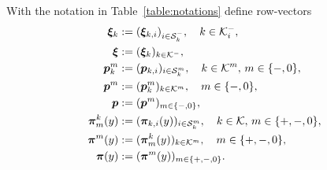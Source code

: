 %
 
With the notation in Table~\ref{table:notations} define row-vectors 
 \begin{align*}
	{\boldsymbol{\xi}}_k &:= ( \boldsymbol\xi_{k,i})_{i\in\mathcal{S}_k^-}, \quad  {k\in\mathcal K_i^-},
	\\ {\boldsymbol{\xi}}& := ( \boldsymbol \xi_k)_{k\in\mathcal K^-},
	\\\boldsymbol{p}^{m}_k &:= (  \boldsymbol p_{k,i})_{i\in\mathcal{S}_k^m}, \quad  k\in{\mathcal K^m},\, m\in\{-,0\},
	\\ {\boldsymbol{p}^m} &:= (  \boldsymbol p^{m}_k)_{k\in\mathcal K^m},\quad m\in\{-,0\},
	\\ {\boldsymbol{p}} &:= (  \boldsymbol p^m)_{m\in\{-,0\}},
	\\{\boldsymbol{\pi}}^{k}_m(y) &:= (  \boldsymbol \pi_{k,i}(y))_{i\in\mathcal{S}_k^m},\quad  k\in\mathcal K,\,m\in\{+,-,0\},
	\\{\boldsymbol{\pi}}^m(y) &:= (\boldsymbol \pi^{k}_m(y))_{k\in\mathcal K^m},\quad  m\in\{+,-,0\},
	\\ {\boldsymbol{\pi}}(y) &:= (  \boldsymbol \pi^m(y))_{m\in\{+,-,0\}}.
 \end{align*}
 
